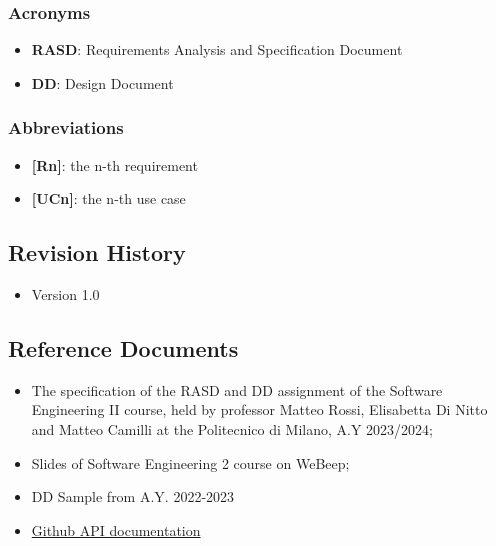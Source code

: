 \documentclass{article}
\begin{document}
\subsubsection{Acronyms}
\begin{itemize}
\item \textbf{RASD}: Requirements Analysis and Specification Document
\item \textbf{DD}: Design Document
\end{itemize}
\subsubsection{Abbreviations}
\begin{itemize}
\item \textbf{[Rn]}: the n-th requirement
\item \textbf{[UCn]}: the n-th use case
\end{itemize}
\subsection{Revision History}
\begin{itemize}
\item Version 1.0
\end{itemize}
\subsection{Reference Documents}
\begin{itemize}
\item The specification of the RASD and DD assignment of the Software
Engineering II course, held by professor Matteo Rossi, Elisabetta Di Nitto and
Matteo Camilli at the Politecnico di Milano, A.Y 2023/2024;
\item Slides of Software Engineering 2 course on WeBeep;
\item DD Sample from A.Y. 2022-2023
\item \href{https://docs.github.com/en/rest?apiVersion=2022-11-28}{Github API documentation}
\end{itemize}
\end{document}
